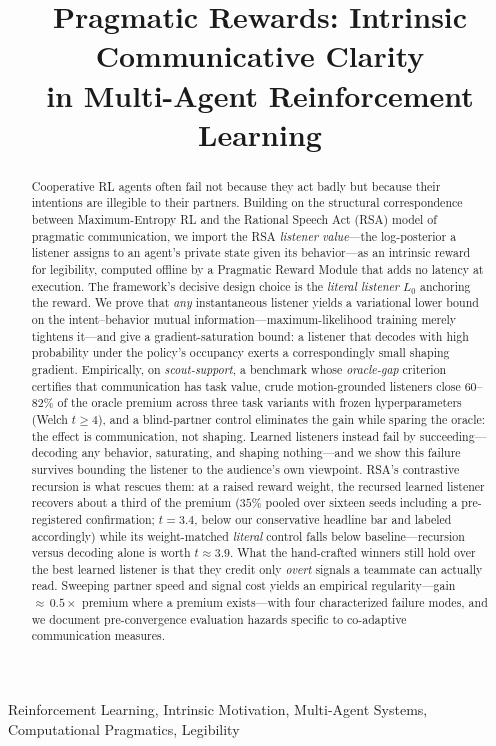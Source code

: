 \documentclass{article}
\title{Pragmatic Rewards: Intrinsic Communicative Clarity\\ in Multi-Agent Reinforcement Learning}
\begin{document}
\maketitle
%
\begin{abstract}
Cooperative RL agents often fail not because they act badly but because their intentions are illegible to their partners. Building on the structural correspondence between Maximum-Entropy RL and the Rational Speech Act (RSA) model of pragmatic communication, we import the RSA \emph{listener value}---the log-posterior a listener assigns to an agent's private state given its behavior---as an intrinsic reward for legibility, computed offline by a Pragmatic Reward Module that adds no latency at execution. The framework's decisive design choice is the \emph{literal listener} $L_0$ anchoring the reward. We prove that \emph{any} instantaneous listener yields a variational lower bound on the intent--behavior mutual information---maximum-likelihood training merely tightens it---and give a gradient-saturation bound: a listener that decodes with high probability under the policy's occupancy exerts a correspondingly small shaping gradient. Empirically, on \emph{scout-support}, a benchmark whose \emph{oracle-gap} criterion certifies that communication has task value, crude motion-grounded listeners close $60$--$82\%$ of the oracle premium across three task variants with frozen hyperparameters (Welch $t\ge4$), and a blind-partner control eliminates the gain while sparing the oracle: the effect is communication, not shaping. Learned listeners instead fail by succeeding---decoding any behavior, saturating, and shaping nothing---and we show this failure survives bounding the listener to the audience's own viewpoint. RSA's contrastive recursion is what rescues them: at a raised reward weight, the recursed learned listener recovers about a third of the premium ($35\%$ pooled over sixteen seeds including a pre-registered confirmation; $t=3.4$, below our conservative headline bar and labeled accordingly) while its weight-matched \emph{literal} control falls below baseline---recursion versus decoding alone is worth $t\approx3.9$. What the hand-crafted winners still hold over the best learned listener is that they credit only \emph{overt} signals a teammate can actually read. Sweeping partner speed and signal cost yields an empirical regularity---gain ${\approx}\,0.5\times$ premium where a premium exists---with four characterized failure modes, and we document pre-convergence evaluation hazards specific to co-adaptive communication measures.
\end{abstract}
%
\begin{keywords}
Reinforcement Learning, Intrinsic Motivation, Multi-Agent Systems, Computational Pragmatics, Legibility
\end{keywords}
%
\end{document}
